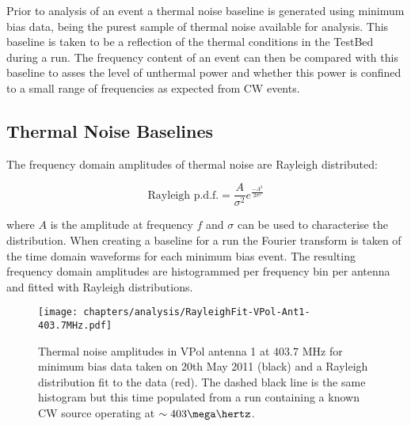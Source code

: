 Prior to analysis of an event a thermal noise baseline is generated using minimum bias data, being the purest sample of thermal noise available for analysis. This baseline is taken to be a reflection of the thermal conditions in the TestBed during a run. The frequency content of an event can then be compared with this baseline to asses the level of unthermal power and whether this power is confined to a small range of frequencies as expected from CW events.

\subsection{Thermal Noise Baselines}
\label{sec:Analysis:CWRemoval:Baselines}

The frequency domain amplitudes of thermal noise are Rayleigh distributed:

\begin{equation}
  \mbox{Rayleigh p.d.f.} = \frac{A}{\sigma^{2}}e^{\frac{-A^{2}}{2\sigma^{2}}}
  \label{eq:Analysis:CWRemoval:Rayleigh-pdf}
\end{equation}

\noindent where $A$ is the amplitude at frequency $f$ and $\sigma$ can be used to characterise the distribution. When creating a baseline for a run the Fourier transform is taken of the time domain waveforms for each minimum bias event. The resulting frequency domain amplitudes are histogrammed per frequency bin per antenna and fitted with Rayleigh distributions.


\begin{figure}[htpb]
  \centering
  \texttt{[image: chapters/analysis/RayleighFit-VPol-Ant1-403.7MHz.pdf]}
  \caption{Thermal noise amplitudes in VPol antenna 1 at 403.7 MHz for minimum bias data taken on 20th May 2011 (black) and a Rayleigh distribution fit to the data (red). The dashed black line is the same histogram but this time populated from a run containing a known CW source operating at $\sim 403 \mega \hertz$.}
  \label{fig:analysis:CWRemoval:Baselines:Rayleigh-Fit}
\end{figure}



